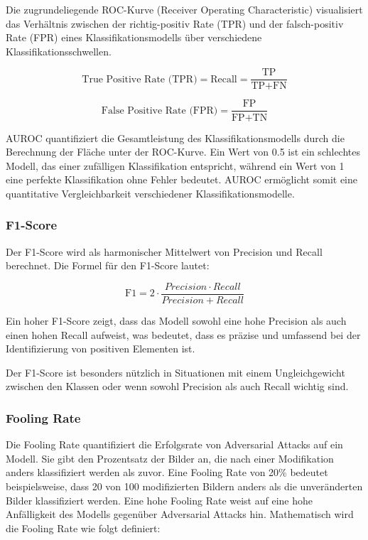 Die zugrundeliegende ROC-Kurve (Receiver Operating Characteristic) visualisiert das Verhältnis zwischen der richtig-positiv Rate (TPR) und der falsch-positiv Rate (FPR) eines Klassifikationsmodells über verschiedene Klassifikationsschwellen. 

\begin{equation}
    \text{True Positive Rate (TPR)} = \text{Recall} =\frac{\text{TP}}{\text{TP} + \text{FN}}
    \label{eq:TPR}
\end{equation}

\begin{equation}
    \text{False Positive Rate (FPR)} = \frac{\text{FP}}{\text{FP} + \text{TN}} 
    \label{eq:FPR}
\end{equation}

AUROC quantifiziert die Gesamtleistung des Klassifikationsmodells durch die Berechnung der Fläche unter der ROC-Kurve. Ein Wert von 0.5 ist ein schlechtes Modell, das einer zufälligen Klassifikation entspricht, während ein Wert von 1 eine perfekte Klassifikation ohne Fehler bedeutet. AUROC ermöglicht somit eine quantitative Vergleichbarkeit verschiedener Klassifikationsmodelle.

\subsubsection{F1-Score} \label{chap:f1-score}
Der F1-Score wird als harmonischer Mittelwert von Precision und Recall berechnet. Die Formel für den F1-Score lautet:

\begin{equation}
    \text{F1} = 2 \cdot \frac{Precision \cdot Recall}{Precision + Recall}
    \label{eq:F1Score}
\end{equation}

Ein hoher F1-Score zeigt, dass das Modell sowohl eine hohe Precision als auch einen hohen Recall aufweist, was bedeutet, dass es präzise und umfassend bei der Identifizierung von positiven Elementen ist.

Der F1-Score ist besonders nützlich in Situationen mit einem Ungleichgewicht zwischen den Klassen oder wenn sowohl Precision als auch Recall wichtig sind.

\subsubsection{Fooling Rate} \label{chap:fooling rate}
Die Fooling Rate quantifiziert die Erfolgsrate von Adversarial Attacks auf ein Modell. Sie gibt den Prozentsatz der Bilder an, die nach einer Modifikation anders klassifiziert werden als zuvor. Eine Fooling Rate von 20\% bedeutet beispielsweise, dass 20 von 100 modifizierten Bildern anders als die unveränderten Bilder klassifiziert werden. Eine hohe Fooling Rate weist auf eine hohe Anfälligkeit des Modells gegenüber Adversarial Attacks hin. Mathematisch wird die Fooling Rate wie folgt definiert:

